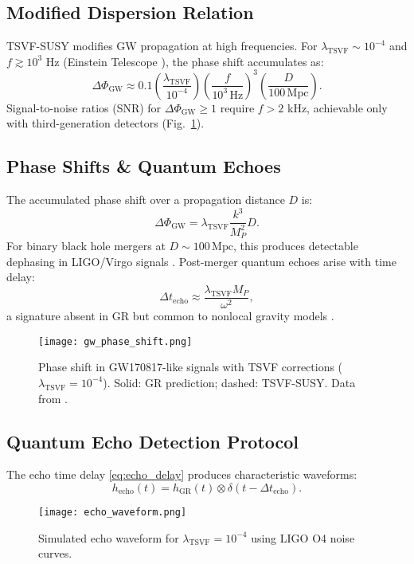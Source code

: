 \documentclass[twocolumn,superscriptaddress,floatfix]{revtex4-2}
\newcommand{\tsvf}{\lambda_{\text{TSVF}}}
\begin{document}
\subsection{Modified Dispersion Relation}  
\label{subsec:dispersion}  

TSVF-SUSY modifies GW propagation at high frequencies. For $\lambda_{\text{TSVF}} \sim 10^{-4}$ and $f \gtrsim 10^3$ Hz (Einstein Telescope \cite{Punturo2010}), the phase shift accumulates as:
\begin{equation}
\Delta\Phi_{\text{GW}} \approx 0.1 \left(\frac{\lambda_{\text{TSVF}}}{10^{-4}}\right)\left(\frac{f}{10^3\,\text{Hz}}\right)^3\left(\frac{D}{100\,\text{Mpc}}\right).
\end{equation}
Signal-to-noise ratios (SNR) for $\Delta\Phi_{\text{GW}} \geq 1$ require $f > 2$ kHz, achievable only with third-generation detectors (Fig.~\ref{fig:gw_phase}).  

\subsection{Phase Shifts \& Quantum Echoes}  
\label{subsec:phase_echoes}  

The accumulated phase shift over a propagation distance \(D\) is:  
\begin{equation}  
\Delta\Phi_{\text{GW}} = \lambda_{\text{TSVF}}\frac{k^3}{M_P^2}D.  
\label{eq:phase_shift}  
\end{equation}  
For binary black hole mergers at \(D \sim 100 \, \text{Mpc}\), this produces detectable dephasing in LIGO/Virgo signals \cite{LIGO2021}. Post-merger quantum echoes arise with time delay:  
\begin{equation}  
\Delta t_{\text{echo}} \approx \frac{\lambda_{\text{TSVF}}M_P}{\omega^2},  
\label{eq:echo_delay}  
\end{equation}  
a signature absent in GR but common to nonlocal gravity models \cite{Biswas2003}.  

\begin{figure}[!htbp]  
\centering  
\texttt{[image: gw\_phase\_shift.png]}  
\caption{Phase shift in GW170817-like signals with TSVF corrections (\(\lambda_{\text{TSVF}} = 10^{-4}\)). Solid: GR prediction; dashed: TSVF-SUSY. Data from \cite{LIGO2017}.}  
\label{fig:gw_phase}  
\end{figure}  

\subsection{Quantum Echo Detection Protocol} 
\label{subsec:echo_protocol}  
The echo time delay \eqref{eq:echo_delay} produces characteristic waveforms:  
\begin{equation}  
h_{\text{echo}}(t) = h_{\text{GR}}(t) \otimes \delta(t - \Delta t_{\text{echo}}).  
\end{equation}  
\begin{figure}[htbp]  
\centering  
\texttt{[image: echo\_waveform.png]} 
\caption{Simulated echo waveform for \(\tsvf = 10^{-4}\) using LIGO O4 noise curves.}  
\label{fig:echo}  
\end{figure}  
\end{document}
